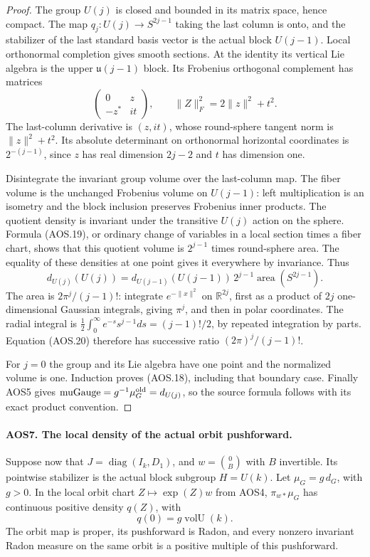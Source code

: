 \documentclass[11pt,a4paper]{article}
\numberwithin{equation}{section}
\theoremstyle{remark}\newtheorem{remark}[theorem]{Remark}
\begin{document}
\begin{proof}
The group $U(j)$ is closed and bounded in its matrix space, hence
compact.  The map $q_j:U(j)\to S^{2j-1}$ taking the last column is
onto, and the stabilizer of the last standard basis vector is the
actual block $U(j-1)$.  Local orthonormal completion gives smooth
sections.  At the identity its vertical Lie algebra is the upper
$\mathfrak u(j-1)$ block.  Its Frobenius orthogonal complement has
matrices
\[
       \begin{pmatrix}0&z\\-z^*&it\end{pmatrix},
       \qquad \|Z\|_F^2=2\|z\|^2+t^2.
 \tag{AOS.19}
\]
The last-column derivative is $(z,it)$, whose round-sphere tangent
norm is $\|z\|^2+t^2$.  Its absolute determinant on orthonormal
horizontal coordinates is $2^{-(j-1)}$, since $z$ has real
dimension $2j-2$ and $t$ has dimension one.

Disintegrate the invariant group volume over the last-column map.
The fiber volume is the unchanged Frobenius volume on $U(j-1)$:
left multiplication is an isometry and the block inclusion preserves
Frobenius inner products.  The quotient density is invariant under
the transitive $U(j)$ action on the sphere.  Formula (AOS.19), or
ordinary change of variables in a local section times a fiber chart,
shows that this quotient volume is $2^{j-1}$ times round-sphere
area.  The equality of these densities at one point gives it
everywhere by invariance.  Thus
\[
 d_{U(j)}(U(j))
      =d_{U(j-1)}(U(j-1))\,2^{j-1}
                        \operatorname{area}(S^{2j-1}).
 \tag{AOS.20}
\]
The area is $2\pi^j/(j-1)!$: integrate $e^{-\|x\|^2}$ on
$\mathbb R^{2j}$, first as a product of $2j$ one-dimensional
Gaussian integrals, giving $\pi^j$, and then in polar coordinates.
The radial integral is
$\tfrac12\int_0^\infty e^{-s}s^{j-1}ds=(j-1)!/2$, by repeated
integration by parts.  Equation (AOS.20) therefore has successive
ratio $(2\pi)^j/(j-1)!$.

For $j=0$ the group and its Lie algebra have one point and the
normalized volume is one.  Induction proves (AOS.18), including
that boundary case.  Finally AOS5 gives
$\operatorname{muGauge}=g^{-1}\mu_G^{\rm old}=d_{U(j)}$,
so the source formula follows with its exact product convention.
\end{proof}

\paragraph{AOS7. The local density of the actual orbit pushforward.}
\label{claim:AOS7}
Suppose now that $J=\operatorname{diag}(I_k,D_1)$, and
$w=\binom{0}{B}$ with $B$ invertible.  Its pointwise stabilizer is
the actual block subgroup $H=U(k)$.  Let $\mu_G=g\,d_G$, with
$g>0$.  In the local orbit chart $Z\mapsto\exp(Z)w$ from AOS4,
$\pi_{w*}\mu_G$ has continuous positive density $q(Z)$, with
\[
                         q(0)=g\operatorname{volU}(k).
 \tag{AOS.21}
\]
The orbit map is proper, its pushforward is Radon, and every nonzero
invariant Radon measure on the same orbit is a positive multiple of
this pushforward.
\end{document}
